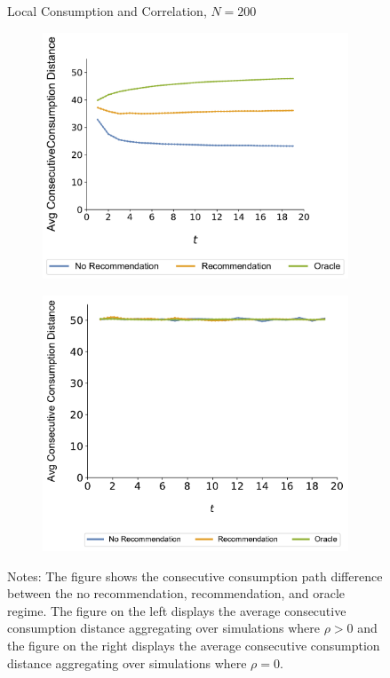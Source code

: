 \documentclass[format=acmsmall, review=false]{acmart}
\begin{document}
\begin{figure}
\caption{Local Consumption and Correlation, $N = 200$}
\begin{subfigure}{.5\linewidth}
  \centering
  \includegraphics[width=.9\linewidth]{figures/rho_pos_consumption_dist_N_200T_20_overall.pdf}
  \label{fig:sfig1}
\end{subfigure}%
\begin{subfigure}{.5\linewidth}
  \centering
  \includegraphics[width=.9\linewidth]{figures/rho_zero_consumption_dist_N_200T_20_overall.pdf}
  \label{fig:sfig2}
\end{subfigure}
\caption*{\scriptsize Notes: The figure shows the consecutive consumption path difference between the no recommendation, recommendation, and oracle regime. The figure on the left displays the average consecutive consumption distance aggregating over simulations where $\rho > 0$ and the figure on the right displays the average consecutive consumption distance aggregating over simulations where $\rho = 0$.}
\label{fig:correlation_consumption_path}
\end{figure}
\end{document}
